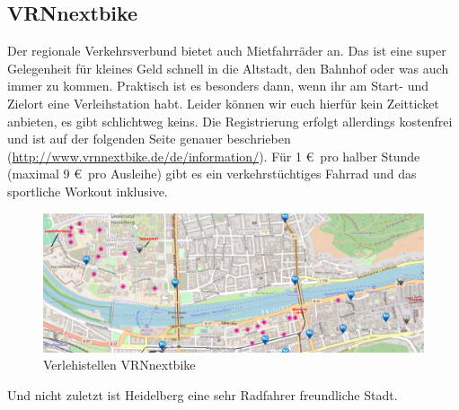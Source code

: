   \subsection{VRNnextbike}
    Der regionale Verkehrsverbund bietet auch Mietfahrräder an. Das ist eine super Gelegenheit
    für kleines Geld schnell in die Altstadt, den Bahnhof oder was auch immer zu kommen.
    Praktisch ist es besonders dann, wenn ihr am Start- und Zielort eine Verleihstation habt.
    Leider können wir euch hierfür kein Zeitticket anbieten, es gibt schlichtweg keins.
    Die Registrierung erfolgt allerdings kostenfrei und ist auf der folgenden Seite
    genauer beschrieben (\url{http://www.vrnnextbike.de/de/information/}).
    Für 1 \euro \, pro halber Stunde (maximal 9 \euro \, pro Ausleihe) gibt es ein verkehrstüchtiges
    Fahrrad und das sportliche Workout inklusive.

    \begin{figure}
      \includegraphics[width=1.0\textwidth]{chapters/mobilitaet/nextbike}
      \caption{Verlehistellen VRNnextbike}
      \label{nextbike}
    \end{figure}

    Und nicht zuletzt ist Heidelberg eine sehr Radfahrer freundliche Stadt.
